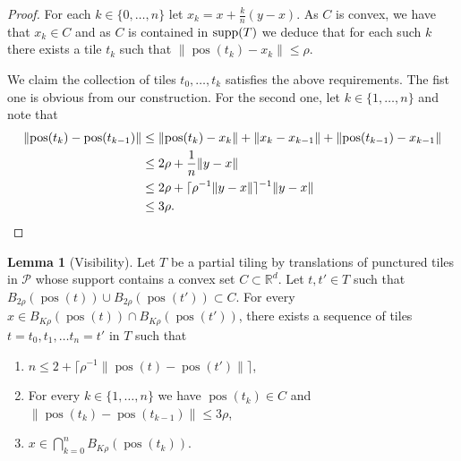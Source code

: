 \documentclass{article}
\theoremstyle{definition}
\newtheorem{lemma}[theorem]{Lemma}
\theoremstyle{definition}
\newcommand{\RR}{\mathbb{R}}
\newcommand{\PP}{\mathcal{P}}
\newcommand{\norm}[1]{\|{#1}\|}
\newcommand{\pos}{\operatorname{pos}}
\newcommand{\supp}{\textnormal{supp}}
\begin{document}
\begin{proof}
    For each $k \in \{0,\dots,n\}$ let $x_k = x + \frac{k}{n}(y-x)$. As $C$ is convex, we have that $x_k \in C$ and as $C$ is contained in $\supp(T)$ we deduce that for each such $k$ there exists a tile $t_k$ such that $\norm{ \pos(t_k) - x_k } \leq \rho$. 

    We claim the collection of tiles $t_0,\dots,t_k$ satisfies the above requirements. The fist one is obvious from our construction. For the second one, let $k \in \{1,\dots,n\}$ and note that \begin{align*}
        \norm{\pos(t_k)-\pos(t_{k-1})} & \leq   \norm{\pos(t_k)-x_k} + \norm{x_k - x_{k-1}} +  \norm{\pos(t_{k-1})-x_{k-1}}\\
         & \leq 2\rho  +\frac{1}{n}\norm{y-x}\\
         & \leq 2\rho  +\lceil  \rho^{-1}\norm{y-x}\rceil^{-1}\norm{y-x}\\
         & \leq 3\rho.\qedhere
    \end{align*}
\end{proof}


\begin{lemma}[Visibility]\label{lem:approach}
    Let $T$ be a partial tiling by translations of punctured tiles in $\PP$ whose support contains a convex set $C\subset \RR^d$. Let $t,t'\in T$ such that $B_{2\rho}(\pos(t))\cup B_{2\rho}(\pos(t')) \subset C$. For every $x \in B_{K\rho}(\pos(t))\cap B_{K\rho}(\pos(t'))$, there exists a sequence of tiles $t = t_0,t_1,\dots t_n = t'$ in $T$ such that 
    \begin{enumerate}
        \item $n \leq  2+\lceil \rho^{-1}\norm{\pos(t)-\pos(t')}\rceil$,
        \item For every $k \in \{1,\dots,n\}$ we have $\pos(t_k)\in C$ and $\norm{\pos(t_{k})-\pos(t_{k-1})}\leq 3\rho$,
        \item $x\in \bigcap_{k=0}^n B_{K\rho}(\pos(t_{k}))$.
    \end{enumerate}
\end{lemma}
\end{document}
